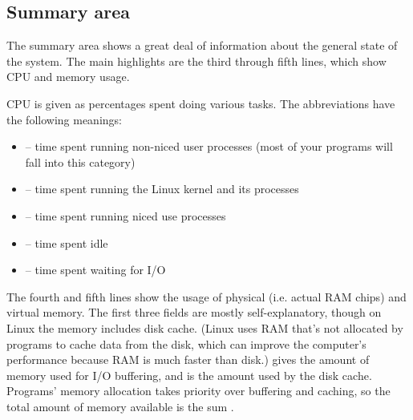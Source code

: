 \documentclass[letterpaper,10pt,english]{sphinxmanual}
\begin{document}
\subsection{Summary area}
\label{top:summary-area}
The summary area shows a great deal of information about the general
state of the system.  The main highlights are the third through fifth
lines, which show CPU and memory usage.

CPU is given as percentages spent doing various tasks.  The
abbreviations have the following meanings:
\begin{itemize}
\item {} 
 -- time spent running non-niced user processes (most of your
programs will fall into this category)

\item {} 
 -- time spent running the Linux kernel and its processes

\item {} 
 -- time spent running niced use processes

\item {} 
 -- time spent idle

\item {} 
 -- time spent waiting for I/O

\end{itemize}

The fourth and fifth lines show the usage of physical (i.e. actual RAM
chips) and virtual memory.  The first three fields are mostly
self-explanatory, though on Linux the  memory includes disk
cache.  (Linux uses RAM that's not allocated by programs to cache data
from the disk, which can improve the computer's performance because
RAM is much faster than disk.)   gives the amount
of memory used for I/O buffering, and  is the amount used by
the disk cache.  Programs' memory allocation takes priority over
buffering and caching, so the total amount of memory available is the
sum .
\end{document}
